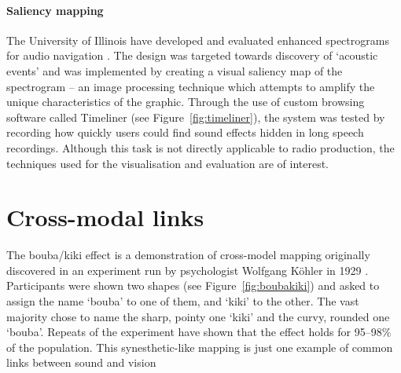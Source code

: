 \paragraph{Saliency mapping}
The University of Illinois have developed and evaluated enhanced spectrograms
for audio navigation \citep{Goudeseune2012,Lin2013}. The design was targeted
towards discovery of `acoustic events' and was implemented by creating a visual
saliency map of the spectrogram -- an image processing technique which attempts
to amplify the unique characteristics of the graphic.  Through the use of
custom browsing software called Timeliner (see Figure~\ref{fig:timeliner}), the
system was tested by recording how quickly users could find sound effects
hidden in long speech recordings. Although this task is not directly
applicable to radio production, the techniques used for the visualisation and
evaluation are of interest.

\section{Cross-modal links}\label{sec:litreviewmodal}
The bouba/kiki effect is a demonstration of cross-model mapping originally
discovered in an experiment run by psychologist Wolfgang K\"{o}hler in 1929
\citep{Koehler1929}. Participants were shown two shapes (see
Figure~\ref{fig:boubakiki}) and asked to assign the name `bouba' to one of
them, and `kiki' to the other. The vast majority chose to name the sharp,
pointy one `kiki' and the curvy, rounded one `bouba'. Repeats of the experiment
\citep{Ramachandran2001} have shown that the effect holds for 95--98\% of the
population. This synesthetic-like mapping \citep{Hubbard1996} is just one
example of common links between sound and vision

